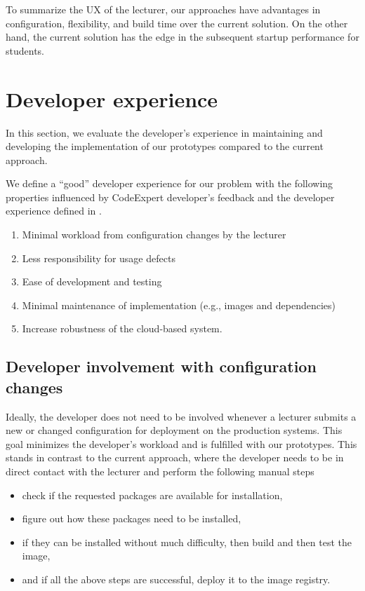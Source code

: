 To summarize the UX of the lecturer, our approaches have advantages in configuration, flexibility, and build time over the current solution. On the other hand, the current solution has the edge in the subsequent startup performance for students. 

\section{Developer experience}\label{result:DevX}
In this section, we evaluate the developer's experience in maintaining and developing the implementation of our prototypes compared to the current approach.

We define a ``good'' developer experience for our problem with the following properties influenced by CodeExpert developer's feedback and the developer experience defined in \cite{fagerholm2012}.
\begin{enumerate}
	\item Minimal workload from configuration changes by the lecturer
	\item Less responsibility for usage defects
	\item Ease of development and testing 
	\item Minimal maintenance of implementation (e.g., images and dependencies)
	\item Increase robustness of the cloud-based system.
\end{enumerate}

\subsection{Developer involvement with configuration changes}
Ideally, the developer does not need to be involved whenever a lecturer submits a new or changed configuration for deployment on the production systems. This goal minimizes the developer's workload and is fulfilled with our prototypes. This stands in contrast to the current approach, where the developer needs to be in direct contact with the lecturer and perform the following manual steps
\begin{itemize}
	\item check if the requested packages are available for installation,
	\item figure out how these packages need to be installed,
	\item if they can be installed without much difficulty, then build and then test the image,
	\item and if all the above steps are successful, deploy it to the image registry.
\end{itemize}

